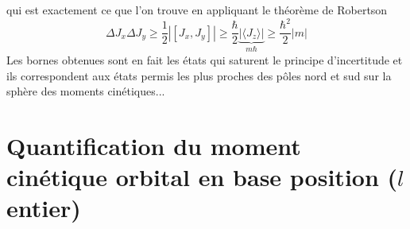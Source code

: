 	qui est exactement ce que l'on trouve en appliquant le théorème de Robertson	
	\begin{equation}
	\Delta J_x\Delta J_y \geq \frac{1}{2}|[J_x,J_y]| \geq \frac{\hbar}{2}\underbrace{|\langle J_z\rangle|}_{m
	\hbar} \geq \frac{\hbar^2}{2}|m|
	\end{equation}
	Les bornes obtenues sont en fait les états qui saturent le principe d'incertitude et ils
	correspondent aux états permis les plus proches des pôles nord et sud sur la sphère des
	moments cinétiques...
	









	

\section{Quantification du moment cinétique orbital en base position ($l$ entier)}
